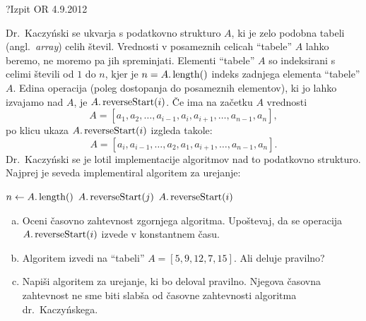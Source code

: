 \begin{naloga}{?}{Izpit OR 4.9.2012}
\begin{vprasanje}[reversestart]
Dr.~Kaczyński se ukvarja s podatkovno strukturo $A$,
ki je zelo podobna tabeli (angl.~{\em array}) celih števil.
Vrednosti v posameznih celicah ``tabele'' $A$ lahko beremo,
ne moremo pa jih spreminjati.
Elementi ``tabele'' $A$ so indeksirani s celimi števili od $1$ do $n$,
kjer je $n = A.\operatorname{length}()$ indeks zadnjega elementa ``tabele'' $A$.
Edina operacija (poleg dostopanja do posameznih elementov),
ki jo lahko izvajamo nad $A$, je $A.\operatorname{reverseStart}(i)$.
Če ima na začetku $A$ vrednosti
$$
A = [a_1, a_2, \dots, a_{i-1}, a_i, a_{i+1}, \dots, a_{n-1}, a_n],
$$
po klicu ukaza $A.\operatorname{reverseStart}(i)$ izgleda takole:
$$
A = [a_i, a_{i-1}, \dots, a_2, a_1, a_{i+1}, \dots, a_{n-1}, a_n] .
$$
Dr.~Kaczyński se je lotil implementacije algoritmov
nad to podatkovno strukturo.
Najprej je seveda implementiral algoritem za urejanje:
\begin{small}
\begin{algorithmic}
\State $n \gets A.\operatorname{length}()$
            \State $A.\operatorname{reverseStart}(j)$
            \State $A.\operatorname{reverseStart}(i)$
        \EndIf
    \EndFor
\EndFor
\end{algorithmic}
\end{small}

\begin{enumerate}[(a)]
\item Oceni časovno zahtevnost zgornjega algoritma.
Upoštevaj, da se operacija $A.\operatorname{reverseStart}(i)$ izvede v konstantnem času.

\item Algoritem izvedi na ``tabeli'' $A = [5, 9, 12, 7, 15]$.
Ali deluje pravilno?

\item Napiši algoritem za urejanje, ki bo deloval pravilno.
Njegova časovna zahtevnost ne sme biti slabša
od časovne zahtevnosti algoritma dr.~Kaczyńskega.
\end{enumerate}
\end{vprasanje}
\begin{odgovor}
\end{odgovor}
\end{naloga}


